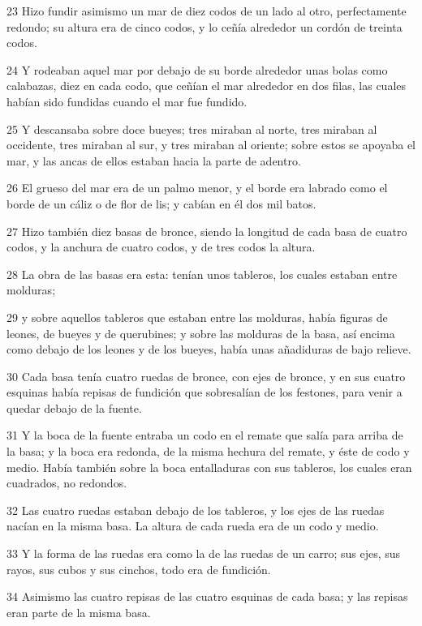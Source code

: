 \par 23 Hizo fundir asimismo un mar de diez codos   de un lado al otro, perfectamente redondo; su altura era de cinco codos, y lo ceñía alrededor un cordón de treinta codos.
\par 24 Y rodeaban aquel mar por debajo de su borde alrededor unas bolas como calabazas, diez en cada codo,  que ceñían el mar alrededor en dos filas, las cuales habían sido fundidas cuando el mar fue fundido.
\par 25 Y descansaba sobre doce bueyes; tres miraban al norte, tres miraban al occidente, tres miraban al sur, y tres miraban al oriente; sobre estos se apoyaba el mar, y las ancas de ellos estaban hacia la parte de adentro.
\par 26 El grueso del mar era de un palmo menor,  y el borde era labrado como el borde de un cáliz o de flor de lis; y cabían en él dos mil batos.
\par 27 Hizo también diez basas de bronce, siendo la longitud de cada basa de cuatro codos,  y la anchura de cuatro codos, y de tres codos la altura.
\par 28 La obra de las basas era esta: tenían unos tableros, los cuales estaban entre molduras;
\par 29 y sobre aquellos tableros que estaban entre las molduras, había figuras de leones, de bueyes y de querubines; y sobre las molduras de la basa, así encima como debajo de los leones y de los bueyes, había unas añadiduras de bajo relieve.
\par 30 Cada basa tenía cuatro ruedas de bronce, con ejes de bronce, y en sus cuatro esquinas había repisas de fundición que sobresalían de los festones, para venir a quedar debajo de la fuente.
\par 31 Y la boca de la fuente entraba un codo   en el remate que salía para arriba de la basa; y la boca era redonda, de la misma hechura del remate, y éste de codo y medio. Había también sobre la boca entalladuras con sus tableros, los cuales eran cuadrados, no redondos.
\par 32 Las cuatro ruedas estaban debajo de los tableros, y los ejes de las ruedas nacían en la misma basa. La altura de cada rueda era de un codo   y medio.
\par 33 Y la forma de las ruedas era como la de las ruedas de un carro; sus ejes, sus rayos, sus cubos y sus cinchos, todo era de fundición.
\par 34 Asimismo las cuatro repisas de las cuatro esquinas de cada basa; y las repisas eran parte de la misma basa.
